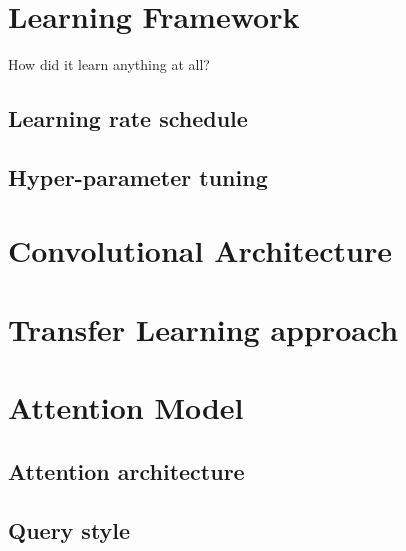 \section{Learning Framework}
\label{sec:learning_framework}

How did it learn anything at all?

\subsection{Learning rate schedule}

\subsection{Hyper-parameter tuning}

\section{Convolutional Architecture}
\label{sec:convolutional_arch}

\section{Transfer Learning approach}
\label{sec:transfer_learning}

\section{Attention Model}
\label{sec:attention_model}

\subsection{Attention architecture}

\subsection{Query style}
